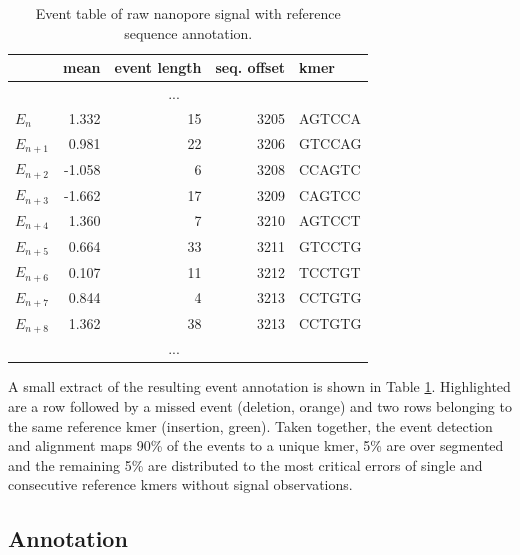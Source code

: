 \begin{table}[ht]
	\centering
	\caption[Event detection and annotation]{Event table of raw nanopore signal with reference sequence annotation.}
	\label{tab:signal:events}
	\begin{tabular}{l|r|r|r|l}
		& mean & event length & seq. offset & kmer \\
		\hline 
		& \multicolumn{3}{c|}{...} &  \\
		\hline
		$ E_{n} $ &  1.332  & 15 & 3205 & AGTCCA \\
		\rowcolor{LightOrange}
		$ E_{n+1} $ &  0.981  & 22 & 3206 & GTCCAG \\
		$ E_{n+2} $ & -1.058  &  6 & 3208 & CCAGTC \\
		$ E_{n+3} $ & -1.662  & 17 & 3209 & CAGTCC \\
		$ E_{n+4} $ &  1.360  &  7 & 3210 & AGTCCT \\
		$ E_{n+5} $ &  0.664  & 33 & 3211 & GTCCTG \\
		$ E_{n+6} $ &  0.107  & 11 & 3212 & TCCTGT \\
		\rowcolor{LightGreen}
		$ E_{n+7} $ &  0.844  &  4 & 3213 & CCTGTG \\
		\rowcolor{LightGreen}
		$ E_{n+8} $ &  1.362  & 38 & 3213 & CCTGTG \\
		\hline
		& \multicolumn{3}{c|}{...} &  \\
	\end{tabular} 
\end{table}

A small extract of the resulting event annotation is shown in Table \ref{tab:signal:events}. Highlighted are a row followed by a missed event (deletion, orange) and two rows belonging to the same reference kmer (insertion, green). Taken together, the event detection and alignment maps 90\% of the events to a unique kmer, 5\% are over segmented and the remaining 5\% are distributed to the most critical errors of single and consecutive reference kmers without signal observations.




\subsection{Annotation}
\label{subsec:signal:annotation}

\cite{Schreiber2015}

